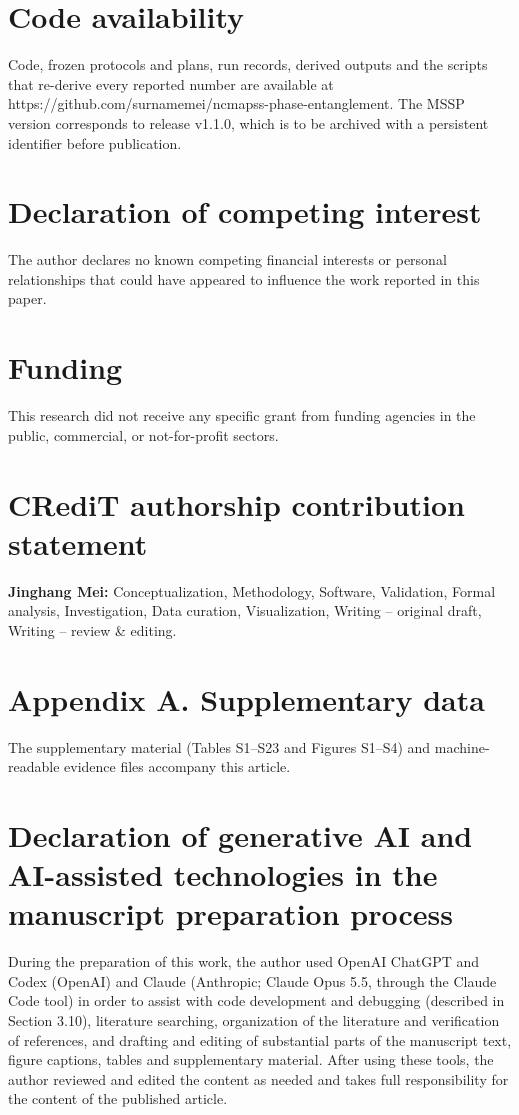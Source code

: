 \documentclass[preprint,11pt,a4paper]{elsarticle}
\begin{document}
\section*{Code availability}

Code, frozen protocols and plans, run records, derived outputs and the scripts that re-derive every reported number are available at https://github.com/surnamemei/ncmapss-phase-entanglement. The MSSP version corresponds to release v1.1.0, which is to be archived with a persistent identifier before publication.

\section*{Declaration of competing interest}

The author declares no known competing financial interests or personal relationships that could have appeared to influence the work reported in this paper.

\section*{Funding}

This research did not receive any specific grant from funding agencies in the public, commercial, or not-for-profit sectors.

\section*{CRediT authorship contribution statement}

\textbf{Jinghang Mei:} Conceptualization, Methodology, Software, Validation, Formal analysis, Investigation, Data curation, Visualization, Writing – original draft, Writing – review \& editing.

\section*{Appendix A. Supplementary data}

The supplementary material (Tables S1–S23 and Figures S1–S4) and machine-readable evidence files accompany this article.

\section*{Declaration of generative AI and AI-assisted technologies in the manuscript preparation process}

During the preparation of this work, the author used OpenAI ChatGPT and Codex (OpenAI) and Claude (Anthropic; Claude Opus 5.5, through the Claude Code tool) in order to assist with code development and debugging (described in Section 3.10), literature searching, organization of the literature and verification of references, and drafting and editing of substantial parts of the manuscript text, figure captions, tables and supplementary material. After using these tools, the author reviewed and edited the content as needed and takes full responsibility for the content of the published article.




\end{document}

